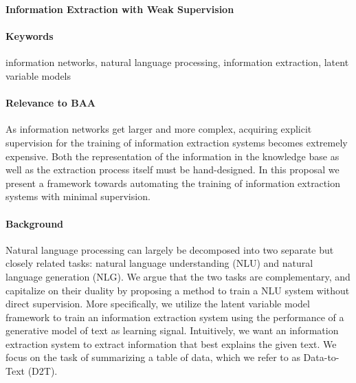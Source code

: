 \documentclass[11pt]{article}
\begin{document}

\begin{center}
\textbf{Information Extraction with Weak Supervision}
\end{center}

\begin{comment}
Spectrum from hard attention => hard segmental => HSMM for generative model, coverage / recall
Should we go into HSMM??? or is hard segmental attention enough

composition function = categorical over two entries of x

structured attention for IE posterior?
\end{comment}

\paragraph{Keywords}
information networks, natural language processing, information extraction,
latent variable models

\paragraph{Relevance to BAA}
As information networks get larger and more complex,
acquiring explicit supervision for the training of information extraction systems
becomes extremely expensive.
Both the representation of the information in the knowledge base
as well as the extraction process itself must be hand-designed.
In this proposal we present a framework towards automating the
training of information extraction systems with minimal supervision.

\paragraph{Background}
Natural language processing can largely be decomposed into two separate but
closely related tasks: natural language understanding (NLU) and natural language
generation (NLG).
We argue that the two tasks are complementary,
and capitalize on their duality by proposing a method to train a NLU system
without direct supervision.
More specifically, we utilize the latent variable model framework to train an information
extraction system using the performance of a generative model of text as learning signal.
Intuitively, we want an information extraction system to extract information that
best explains the given text.
We focus on the task of summarizing a table of data,
which we refer to as Data-to-Text (D2T).
\end{document}
